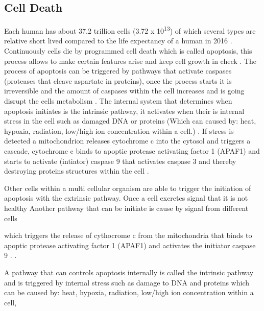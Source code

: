 \subsection{Cell Death}
Each human has about 37.2 trillion cells (3.72 x 10\textsuperscript{13}) \cite{} of which several types are relative short lived \cite{} compared to the life expectancy of a human in 2016 \cite{}. 
Continuously cells die by programmed cell death which is called apoptosis, this process allows to make certain features arise and keep cell growth in check \cite{}.
The process of apoptosis can be triggered by pathways that activate caspases (proteases that cleave aspartate in proteins), once the process starts it is irreversible and the amount of caspases within the cell increases and is going disrupt the cells metabolism \cite{}.
The internal system that determines when apoptosis initiates is the intrinsic pathway, it activates when their is internal stress in the cell such as damaged DNA or proteins (Which can caused by: heat, hypoxia, radiation, low/high ion concentration within a cell.)  \cite{}. 
If stress is detected a mitochondrion releases cytochrome c into the cytosol and triggers a cascade, cytochrome c binds to apoptic protease activating factor 1 (APAF1) and starts to activate (intiator) caspase 9 that activates caspase 3 and thereby destroying proteins structures within the cell \cite{}. 

Other cells within a multi cellular organism are able to trigger the initiation of apoptosis with the extrinsic pathway. Once a cell excretes signal that it is not healthy 
Another pathway that can be initiate is cause by signal from different cells 


which triggers the release of cythocrome c from the mitochondria that binds to apoptic protease activating factor 1 (APAF1) and activates the initiator caspase 9 .  \cite{}.


A pathway that can controls apoptosis internally is called the intrinsic pathway and is triggered by internal stress such as damage to DNA and proteins which can be caused by: heat, hypoxia, radiation, low/high ion concentration within a cell, \cite{}



